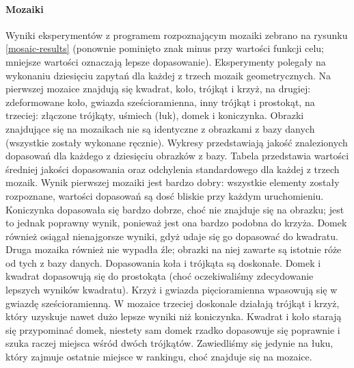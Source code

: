 \documentclass[a4paper,12pt,leqno]{article}
\begin{document}
\paragraph{Mozaiki} Wyniki eksperymentów z programem rozpoznającym mozaiki zebrano na rysunku \ref{mosaic-results} (ponownie pominięto znak minus przy wartości funkcji celu; mniejsze
wartości oznaczają lepsze dopasowanie). Eksperymenty polegały na wykonaniu dziesięciu zapytań dla każdej z trzech mozaik geometrycznych. Na pierwszej mozaice znajdują się kwadrat, koło,
trójkąt i krzyż, na drugiej: zdeformowane koło, gwiazda sześcioramienna, inny trójkąt i prostokąt, na trzeciej: złączone trójkąty, uśmiech (łuk), domek i koniczynka. Obrazki znajdujące
się na mozaikach nie są identyczne z obrazkami z bazy danych (wszystkie zostały wykonane ręcznie). Wykresy przedstawiają jakość znalezionych dopasowań dla każdego z dziesięciu obrazków z bazy. 
Tabela przedstawia wartości średniej jakości dopasowania oraz odchylenia standardowego dla każdej z trzech mozaik. Wynik pierwszej mozaiki jest bardzo dobry: wszystkie elementy zostały
rozpoznane, wartości dopasowań są dosć bliskie przy każdym uruchomieniu. Koniczynka dopasowała się bardzo dobrze, choć nie znajduje się na obrazku; jest to jednak poprawny wynik, ponieważ
jest ona bardzo podobna do krzyża. Domek również osiągał nienajgorsze wyniki, gdyż udaje się go dopasować do kwadratu. Druga mozaika również nie wypadła źle; obrazki na niej zawarte są
istotnie róże od tych z bazy danych. Dopasowania koła i trójkąta są doskonałe. Domek i kwadrat dopasowują się do prostokąta (choć oczekiwaliśmy zdecydowanie lepszych wyników kwadratu).
Krzyż i gwiazda pięcioramienna wpasowują się w gwiazdę sześcioramienną. W mozaice trzeciej doskonale działają trójkąt i krzyż, który uzyskuje nawet dużo lepsze wyniki niż koniczynka.
Kwadrat i koło starają się przypominać domek, niestety sam domek rzadko dopasowuje się poprawnie i szuka raczej miejsca wśród dwóch trójkątów. Zawiedliśmy się jedynie na łuku, który
zajmuje ostatnie miejsce w rankingu, choć znajduje się na mozaice.
\end{document}
